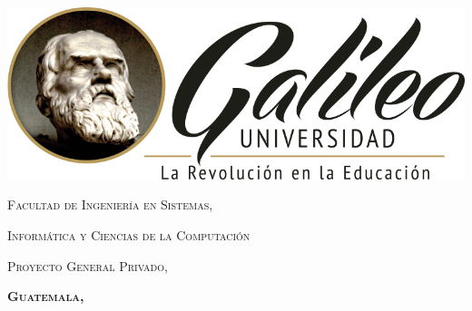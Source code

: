 \documentclass[
12pt, %
spanish, %
doublespacing, %
liststotoc, %
parskip, %
headsepline, %
table,
]{MastersDoctoralThesis} %
\author{José Jacobo \textsc{Del Valle Girón}} %
\begin{document}
\frontmatter %

\pagestyle{plain} %


\begin{titlepage}
\begin{center}

\begingroup\onehalfspacing

{\scshape\LARGE \authorname\par}\vspace{1.5cm} %

{\huge \bfseries \ttitle\par} %

\vspace{1.5cm}

\includegraphics[scale=0.5]{logo.png} %

\vspace{1.5cm}

{\scshape\Large \univname\par} %
{\scshape\Large Facultad de Ingeniería en Sistemas,}
{\scshape\Large Informática y Ciencias de la Computación\par}
{\scshape \Large Proyecto General Privado,\par}
{\scshape \Large \bfseries Guatemala, \the\year}

\endgroup
 
\vfill
\end{center}
\end{titlepage}

\end{document}
